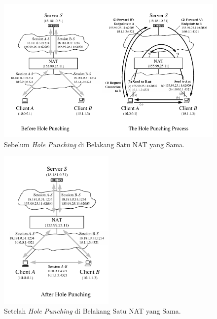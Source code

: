 \nocite{ford2005peer}

\begin{figure}[H]
  \centering{}
  \includegraphics[width=1\textwidth]{gambar/hole_punching_behind_same_nat_1}
  \caption{Sebelum \emph{Hole Punching} di Belakang Satu NAT yang Sama.}
\end{figure}

\begin{figure}[H]
  \centering{}
  \includegraphics[width=0.5\textwidth]{gambar/hole_punching_behind_same_nat_2}
  \caption{Setelah \emph{Hole Punching} di Belakang Satu NAT yang Sama.}
\end{figure}



